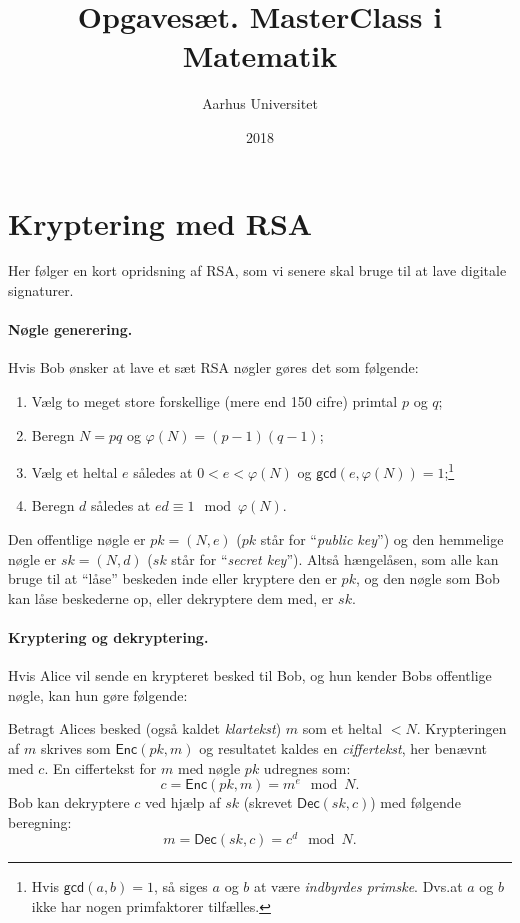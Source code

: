 \documentclass{article}
\theoremstyle{opgavedd}
\newcommand\Enc{\ensuremath{\mathsf{Enc}}}
\newcommand\Dec{\ensuremath{\mathsf{Dec}}}
\begin{document}
\title{Opgavesæt. MasterClass i Matematik}
\author{Aarhus Universitet}
\date{2018}
\maketitle

\section{Kryptering med RSA}
Her følger en kort opridsning af RSA, som vi senere skal bruge til at lave digitale
signaturer.

\paragraph{Nøgle generering.}
Hvis Bob ønsker at lave et sæt RSA nøgler gøres det som følgende:
\begin{enumerate}

\item Vælg to meget store forskellige (mere end 150 cifre) primtal $p$ og $q$;

\item Beregn $N = pq$ og $\varphi(N)=(p-1)(q-1)$;

\item Vælg et heltal $e$ således at $0 < e < \varphi(N)$ og
  $\mathsf{gcd}(e,\varphi(N))=1$;\footnote{Hvis $\mathsf{gcd}(a,b)=1$, så siges $a$ og $b$
    at være \emph{indbyrdes primske}. Dvs.\@ at $a$ og $b$ ikke har nogen primfaktorer
    tilfælles.}

\item Beregn $d$ således at $ed\equiv 1\mod\varphi(N)$.

\end{enumerate}
Den offentlige nøgle er $pk=(N,e)$ ($pk$ står for ``\emph{public key}'') og den hemmelige
nøgle er $sk=(N,d)$ ($sk$ står for ``\emph{secret key}''). Altså hængelåsen, som alle kan
bruge til at ``låse'' beskeden inde eller kryptere den er $pk$, og den nøgle som Bob kan
låse beskederne op, eller dekryptere dem med, er $sk$.

\paragraph{Kryptering og dekryptering.}
Hvis Alice vil sende en krypteret besked til Bob, og hun kender Bobs offentlige nøgle,
kan hun gøre følgende:

Betragt Alices besked (også kaldet \emph{klartekst}) $m$ som et heltal $< N$. Krypteringen af $m$ skrives som
$\Enc(pk,m)$ og resultatet kaldes en \emph{ciffertekst}, her benævnt med $c$. En
ciffertekst for $m$ med nøgle $pk$ udregnes som:
\[
  c = \Enc(pk, m) = m^{e}\mod N.
\]
Bob kan dekryptere $c$ ved hjælp af $sk$ (skrevet $\Dec(sk,c)$) med følgende
beregning:
\[
  m = \Dec(sk, c) = c^{d}\mod N.
\]
\end{document}
